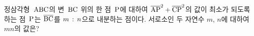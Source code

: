 정삼각형~$\mathrm{ABC}$의 변~$\mathrm{BC}$ 위의 한 점~$\mathrm{P}$에 대하여 $\overline{\mathrm{AP}}^2+\overline{\mathrm{CP}}^2$의 값이 최소가 되도록 하는 점~$\mathrm{P}$는 $\overline{\mathrm{BC}}$를 $m\mkern3mu :\mkern3mu n$으로 내분하는 점이다. 서로소인 두 자연수 $m$, $n$에 대하여 $mn$의 값은?
